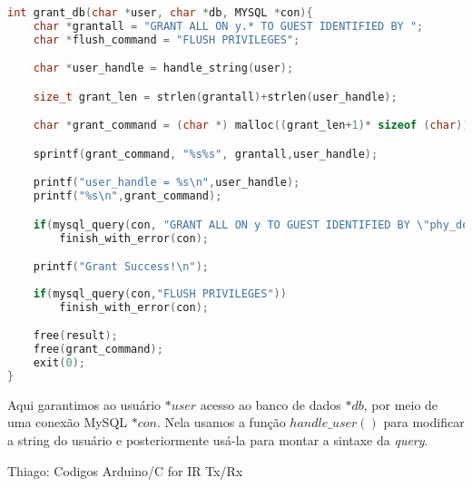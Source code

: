 \begin{lstlisting}[language=c, caption={fun\c{c}\~{a}o $grant\_db()$}, label={lst:dbphi8}]
int grant_db(char *user, char *db, MYSQL *con){
    char *grantall = "GRANT ALL ON y.* TO GUEST IDENTIFIED BY ";
	char *flush_command = "FLUSH PRIVILEGES";

	char *user_handle = handle_string(user);

	size_t grant_len = strlen(grantall)+strlen(user_handle);

	char *grant_command = (char *) malloc((grant_len+1)* sizeof (char));

	sprintf(grant_command, "%s%s", grantall,user_handle);

	printf("user_handle = %s\n",user_handle);
	printf("%s\n",grant_command);

	if(mysql_query(con, "GRANT ALL ON y TO GUEST IDENTIFIED BY \"phy_dev\""))
		finish_with_error(con);

	printf("Grant Success!\n");
	
	if(mysql_query(con,"FLUSH PRIVILEGES"))
		finish_with_error(con);

	free(result);
	free(grant_command);	
	exit(0);
}
\end{lstlisting}

Aqui garantimos ao usu\'{a}rio \textit{$*user$} acesso ao banco de dados
\textit{$*db$}, por meio de uma conex\~{a}o MySQL \textit{$*con$}. Nela usamos a
fun\c{c}\~{a}o \textit{$handle\_user()$} para modificar a string do usu\'{a}rio
e posteriormente us\'{a}-la para montar a sintaxe da \textit{query}.

\begin{section}{Thiago: Codigos Arduino/C for IR Tx/Rx}
\end{section}
